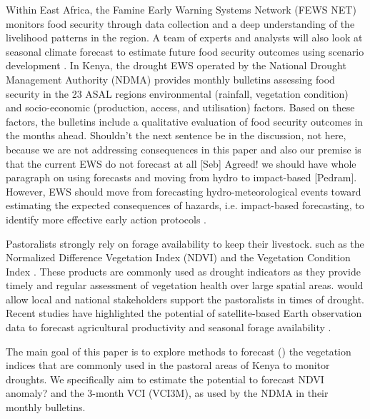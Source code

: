 \documentclass[review]{elsarticle}
\begin{document}
Within East Africa, the Famine Early Warning Systems Network (FEWS NET) monitors food security through data collection and a deep understanding of the livelihood patterns in the region. A team of experts and analysts will also look at seasonal climate forecast to estimate future food security outcomes using scenario development \citep{FEWS}. In Kenya, the drought EWS operated by the National Drought Management Authority (NDMA) provides monthly bulletins assessing food security in the 23 ASAL regions   environmental (rainfall, vegetation condition) and socio-economic (production, access, and utilisation) factors. Based on these factors, the bulletins include a qualitative evaluation of food security outcomes in the months ahead. {\color{red} Shouldn't the next sentence be in the discussion, not here, because we are not addressing consequences in this paper and also our premise is that the current EWS do not forecast at all [Seb]}{\color{green} Agreed! we should have whole paragraph on using forecasts and moving from hydro to impact-based [Pedram]}. However, EWS should move from forecasting hydro-meteorological events toward estimating the expected consequences of hazards, i.e. impact-based forecasting, to identify more effective early action protocols \citep{wmo2015wmo,nhess-2018-26}.

Pastoralists strongly rely on forage availability to keep their livestock.  such as the Normalized Difference Vegetation Index (NDVI) and the Vegetation Condition Index  \citep[VCI,][]{KOGAN199591,rs8040267,RULINDA201132,ROJAS2011343}. These products are commonly used as drought indicators as they provide timely and regular assessment of vegetation health over large spatial areas.  would allow local and national stakeholders  support the pastoralists in times of drought. Recent studies have highlighted the potential of satellite-based Earth observation data to forecast agricultural productivity \citep{ZAMBRANO201815} and seasonal forage availability \citep{VRIELING201644}.

The main goal of this paper is to explore methods to forecast () the vegetation indices that are commonly used in the pastoral areas of Kenya to monitor droughts. We specifically aim to estimate the potential to forecast NDVI {\color{green} anomaly?} and the 3-month VCI (VCI3M), as used by the NDMA in their monthly bulletins. 
\end{document}
